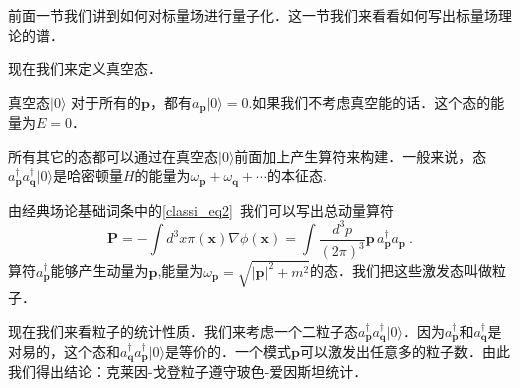 
前面一节我们讲到如何对标量场进行量子化．这一节我们来看看如何写出标量场理论的谱．

现在我们来定义真空态．
\begin{definition}{真空态$|0\rangle$}
对于所有的$\mathbf p$，都有$a_{\mathbf p}|0\rangle=0$.如果我们不考虑真空能的话．这个态的能量为$E=0$．
\end{definition}
所有其它的态都可以通过在真空态$|0\rangle$前面加上产生算符来构建．一般来说，态$a^\dagger_{\mathbf p}a^\dagger_{\mathbf q}|0\rangle$是哈密顿量$H$的能量为$\omega_{\mathbf p}+\omega_{\mathbf q}+\cdots$的本征态.

由经典场论基础词条中的\autoref{classi_eq2}~我们可以写出总动量算符
\begin{equation}
\mathbf P = -\int d^3 x \pi(\mathbf x) \nabla \phi(\mathbf x) = \int \frac{d^3p}{(2\pi)^3} \mathbf p\, a^\dagger_{\mathbf p} a_{\mathbf p}~. 
\end{equation}
算符$a_{\mathbf p}^\dagger$能够产生动量为$\mathbf p$,能量为$\omega_{\mathbf p} = \sqrt{|\mathbf p|^2+m^2}$的态．我们把这些激发态叫做粒子．

现在我们来看粒子的统计性质．我们来考虑一个二粒子态$a^\dagger_{\mathbf p}a^\dagger_{\mathbf q}| 0 \rangle$．因为$a^\dagger_{\mathbf p}$和$a^\dagger_{\mathbf q}$是对易的，这个态和$a^\dagger_{\mathbf q}a^\dagger_{\mathbf p}| 0 \rangle$是等价的．一个模式$\mathbf p$可以激发出任意多的粒子数．由此我们得出结论：克莱因-戈登粒子遵守玻色-爱因斯坦统计．

